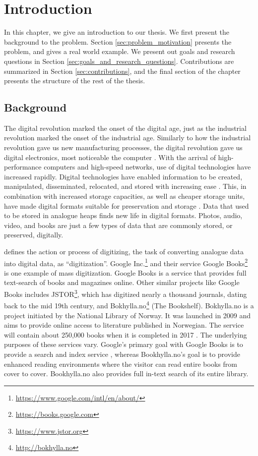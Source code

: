 
\chapter{Introduction}
\label{ch:introduction}
In this chapter, we give an introduction to our thesis. We first present the background to the problem. Section \ref{sec:problem_motivation} presents the problem, and gives a real world example. We present out goals and research questions in Section \ref{sec:goals_and_research_questions}. Contributions are summarized in Section \ref{sec:contributions}, and the final section of the chapter presents the structure of the rest of the thesis.

\section{Background}
The digital revolution marked the onset of the digital age, just as the industrial revolution marked the onset of the industrial age. Similarly to how the industrial revolution gave us new manufacturing processes, the digital revolution gave us digital electronics, most noticeable the computer \citep{freeman2001time}. With the arrival of high-performance computers and high-speed networks, use of digital technologies have increased rapidly. Digital technologies have enabled information to be created, manipulated, disseminated, relocated, and stored with increasing ease \citep{lee2002state}. This, in combination with increased storage capacities, as well as cheaper storage units, have made digital formats suitable for preservation and storage \citep{morris2003evolution}. Data that used to be stored in analogue heaps finds new life in digital formats. Photos, audio, video, and books are just a few types of data that are commonly stored, or preserved, digitally.

\cite{misc-oed-digitization} defines the action or process of digitizing, the task of converting analogue data into digital data, as ``digitization''. Google Inc.\footnote{\url{https://www.google.com/intl/en/about/}} and their service Google Books\footnote{\url{https://books.google.com}} is one example of mass digitization. Google Books is a service that provides full text-search of books and magazines online. Other similar projects like Google Books includes JSTOR\footnote{\url{https://www.jstor.org}}, which has digitized nearly a thousand journals, dating back to the mid 19th century, and Bokhylla.no\footnote{\url{http://bokhylla.no}} (The Bookshelf). Bokhylla.no is a project initiated by the National Library of Norway. It was launched in 2009 and aims to provide online access to literature published in Norwegian. The service will contain about 250,000 books when it is completed in 2017 \citep{misc-nb-digial-library}. The underlying purposes of these services vary. Google's primary goal with Google Books is to provide a search and index service \citep{coyle2006mass}, whereas Bookhylla.no's goal is to provide enhanced reading environments where the visitor can read entire books from cover to cover. Bookhylla.no also provides full in-text search of its entire library. 

